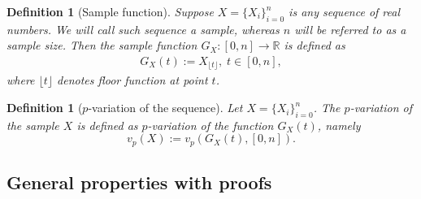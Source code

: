 \documentclass[12pt, a4paper]{article}
\newtheorem{definition}[theorem]{Definition}
\numberwithin{equation}{section}
\begin{document}
\begin{definition}[Sample function]\label{def:Seq2Fun}
  Suppose $X=\{X_{i}\}_{i=0}^{n}$ is 
  any sequence of real numbers. 
  We will call such sequence a \emph{sample}, 
  whereas $n$ will be referred to as a 
  \emph{sample size}.
  Then the \emph{sample function}  
  $G_X:[0,n] \rightarrow \mathbb{R}$ is defined as 
  \begin{eqnarray}
    G_X(t) := X_{\lfloor t \rfloor},\;t\in[0,n],
  \end{eqnarray}
  where $\lfloor t \rfloor$ denotes floor 
  function at point $t$. 
\end{definition} 

\begin{definition}[$p$-variation of the sequence]\label{def:pvarseq}
  Let $X=\{X_i\}_{i=0}^n$. The $p$-variation
  of the sample $X$ is defined as $p$-variation of the 
  function $G_X(t)$, namely
  \begin{equation}
    v_p(X) := v_p(G_X(t),[0,n]).
  \end{equation}
\end{definition}


\subsection{General properties with proofs}
\end{document}
